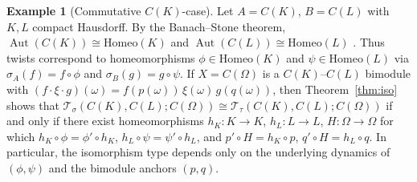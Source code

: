 \documentclass{article}
\theoremstyle{plain}
\theoremstyle{definition}
\newtheorem{example}[theorem]{Example}
\newcommand{\T}{\mathcal{T}}
\newcommand{\Aut}{\operatorname{Aut}}
\begin{document}
\begin{example}[Commutative $C(K)$-case]\label{ex:CK}
Let $A=C(K)$, $B=C(L)$ with $K,L$ compact Hausdorff. By the Banach--Stone theorem,
$\Aut(C(K))\cong\mathrm{Homeo}(K)$ and $\Aut(C(L))\cong\mathrm{Homeo}(L)$ \cite{GillmanJerison}.
Thus twists correspond to homeomorphisms $\phi\in\mathrm{Homeo}(K)$ and $\psi\in\mathrm{Homeo}(L)$ via
$\sigma_A(f)=f\circ\phi$ and $\sigma_B(g)=g\circ\psi$.
If $X=C(\Omega)$ is a $C(K)$--$C(L)$ bimodule with
$(f\cdot\xi\cdot g)(\omega)=f(p(\omega))\,\xi(\omega)\,g(q(\omega))$, then
Theorem~\ref{thm:iso} shows that $\T_\sigma(C(K),C(L);C(\Omega))\cong\T_\tau(C(K),C(L);C(\Omega))$
if and only if there exist homeomorphisms $h_K\!:K\to K$, $h_L\!:L\to L$, $H\!:\Omega\to\Omega$ for which
$h_K\circ\phi=\phi'\circ h_K$, $h_L\circ\psi=\psi'\circ h_L$, and $p'\circ H=h_K\circ p$, $q'\circ H=h_L\circ q$.
In particular, the isomorphism type depends only on the underlying dynamics of $(\phi,\psi)$ and the
bimodule anchors $(p,q)$.
\end{example}
\end{document}

